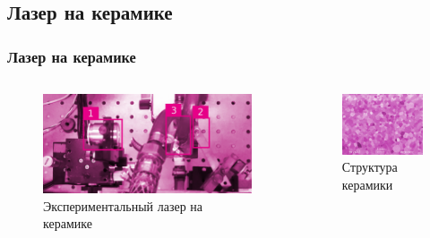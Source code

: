 \documentclass[10pt,pdf,hyperref={unicode}, dvipsnames]{beamer}
\newcommand\frametitless[1]{\subsection{#1}\frametitle{#1}}
\begin{document}
\begin{frame}[t]
	\frametitless{Лазер на керамике}
	
	\begin{columns}
		\begin{column}{0.63\textwidth}
			\begin{figure}[tb]
				\centering
				\includegraphics[width=\textwidth]{photo/s2.jpg}
				\caption{Экспериментальный лазер на керамике}
			\end{figure}
		\end{column}
		\begin{column}{0.4\textwidth}
			\begin{figure}[tb]  
				\centering
				\includegraphics[width=\textwidth]{photo/ke2.jpg}
				\caption{Структура керамики}
			\end{figure}
		\end{column}
	\end{columns}	
		\vspace{1em}

\end{frame}
\end{document}
